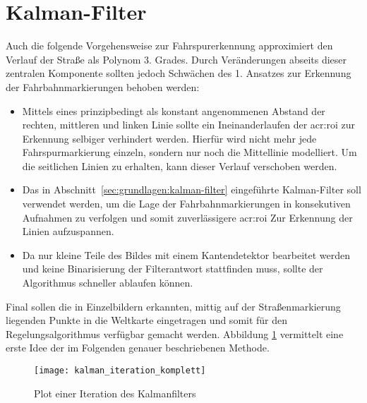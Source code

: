 \section{Kalman-Filter \dcsecondauthorshort}
\label{sec:fahrspurerkennung_kalman}
Auch die folgende Vorgehensweise zur Fahrspurerkennung approximiert den Verlauf der Straße als Polynom 3. Grades. Durch Veränderungen abseits dieser zentralen Komponente sollten jedoch Schwächen des 1. Ansatzes zur Erkennung der Fahrbahnmarkierungen behoben werden:
\begin{itemize}
\item Mittels eines prinzipbedingt als konstant angenommenen Abstand der rechten, mittleren und linken Linie sollte ein \glqq Ineinanderlaufen\grqq{} der \gls{acr:roi}
zur Erkennung selbiger verhindert werden. Hierfür wird nicht mehr jede Fahrspurmarkierung einzeln, sondern nur noch die Mittellinie modelliert. Um die seitlichen Linien zu erhalten, kann dieser Verlauf verschoben werden.
\item Das in Abschnitt~\ref{sec:grundlagen:kalman-filter} eingeführte Kalman-Filter soll verwendet werden, um die Lage der Fahrbahnmarkierungen in konsekutiven Aufnahmen zu verfolgen und somit zuverlässigere \gls{acr:roi} Zur Erkennung der Linien aufzuspannen.
\item Da nur kleine Teile des Bildes mit einem Kantendetektor bearbeitet werden und keine Binarisierung der Filterantwort stattfinden muss, sollte der Algorithmus schneller ablaufen können.
\end{itemize}
Final sollen die in Einzelbildern erkannten, mittig auf der Straßenmarkierung liegenden Punkte in die Weltkarte eingetragen und somit für den Regelungsalgorithmus verfügbar gemacht werden. Abbildung \ref{fig:kalman:iteration_komplett} vermittelt eine erste Idee der im Folgenden genauer beschriebenen Methode.

\begin{figure}[htbp]
\centering
\texttt{[image: kalman\_iteration\_komplett]}
\caption{Plot einer Iteration des Kalmanfilters}
\label{fig:kalman:iteration_komplett}
\end{figure}
 
